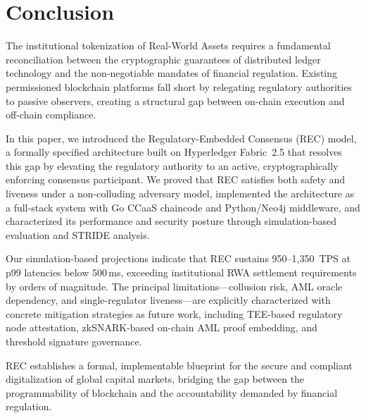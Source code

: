 \documentclass[journal,10pt,twocolumn]{IEEEtran}
\begin{document}
\section{Conclusion}
\label{sec:conclusion}

The institutional tokenization of Real-World Assets requires a fundamental reconciliation between the cryptographic guarantees of distributed ledger technology and the non-negotiable mandates of financial regulation. Existing permissioned blockchain platforms fall short by relegating regulatory authorities to passive observers, creating a structural gap between on-chain execution and off-chain compliance.

In this paper, we introduced the Regulatory-Embedded Consensus (REC) model, a formally specified architecture built on Hyperledger Fabric~2.5 that resolves this gap by elevating the regulatory authority to an active, cryptographically enforcing consensus participant. We proved that REC satisfies both safety and liveness under a non-colluding adversary model, implemented the architecture as a full-stack system with Go CCaaS chaincode and Python/Neo4j middleware, and characterized its performance and security posture through simulation-based evaluation and STRIDE analysis.

Our simulation-based projections indicate that REC sustains 950--1,350~TPS at p99 latencies below 500\,ms, exceeding institutional RWA settlement requirements by orders of magnitude. The principal limitations---collusion risk, AML oracle dependency, and single-regulator liveness---are explicitly characterized with concrete mitigation strategies as future work, including TEE-based regulatory node attestation, zkSNARK-based on-chain AML proof embedding, and threshold signature governance.

REC establishes a formal, implementable blueprint for the secure and compliant digitalization of global capital markets, bridging the gap between the programmability of blockchain and the accountability demanded by financial regulation.
\end{document}
